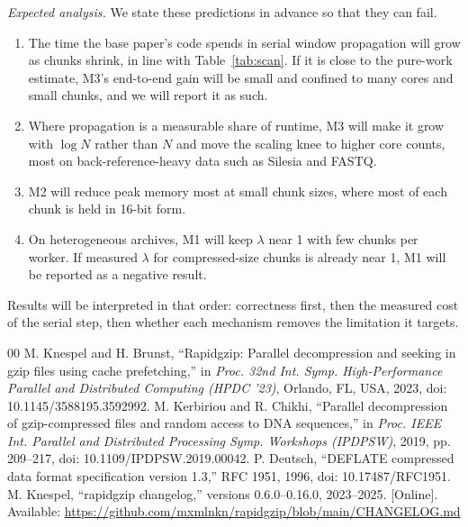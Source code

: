 \documentclass[conference]{IEEEtran}
\begin{document}
\emph{Expected analysis.} We state these predictions in advance so that they can
fail.
\begin{enumerate}
\item The time the base paper's code spends in serial window propagation will
grow as chunks shrink, in line with Table~\ref{tab:scan}. If it is close to the
pure-work estimate, M3's end-to-end gain will be small and confined to many cores
and small chunks, and we will report it as such.
\item Where propagation is a measurable share of runtime, M3 will make it grow
with $\log N$ rather than $N$ and move the scaling knee to higher core counts,
most on back-reference-heavy data such as Silesia and FASTQ.
\item M2 will reduce peak memory most at small chunk sizes, where most of each
chunk is held in 16-bit form.
\item On heterogeneous archives, M1 will keep $\lambda$ near 1 with few chunks per
worker. If measured $\lambda$ for compressed-size chunks is already near 1, M1
will be reported as a negative result.
\end{enumerate}
Results will be interpreted in that order: correctness first, then the measured
cost of the serial step, then whether each mechanism removes the limitation it
targets.

\begin{thebibliography}{00}
 M. Knespel and H. Brunst, ``Rapidgzip: Parallel decompression and seeking in gzip files using cache prefetching,'' in \emph{Proc. 32nd Int. Symp. High-Performance Parallel and Distributed Computing (HPDC '23)}, Orlando, FL, USA, 2023, doi: 10.1145/3588195.3592992.
 M. Kerbiriou and R. Chikhi, ``Parallel decompression of gzip-compressed files and random access to DNA sequences,'' in \emph{Proc. IEEE Int. Parallel and Distributed Processing Symp. Workshops (IPDPSW)}, 2019, pp. 209--217, doi: 10.1109/IPDPSW.2019.00042.
 P. Deutsch, ``DEFLATE compressed data format specification version 1.3,'' RFC 1951, 1996, doi: 10.17487/RFC1951.
 M. Knespel, ``rapidgzip changelog,'' versions 0.6.0--0.16.0, 2023--2025. [Online]. Available: \url{https://github.com/mxmlnkn/rapidgzip/blob/main/CHANGELOG.md}
\end{thebibliography}
\end{document}
